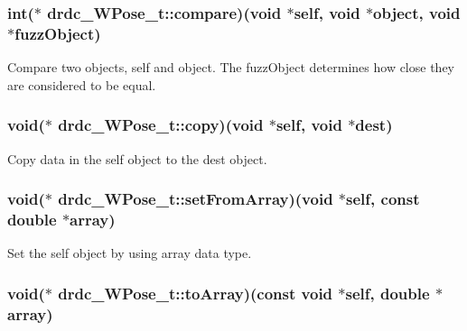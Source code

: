 \hypertarget{structdrdc__WPose__t_99b866961db8996097b6febfc6dad41e}{
\subsubsection[compare]{\setlength{\rightskip}{0pt plus 5cm}int($\ast$ {\bf drdc\_\-WPose\_\-t::compare})(void $\ast$self, void $\ast$object, void $\ast$fuzzObject)}}
\label{structdrdc__WPose__t_99b866961db8996097b6febfc6dad41e}


Compare two objects, self and object. The fuzzObject determines how close they are considered to be equal. 

\hypertarget{structdrdc__WPose__t_47a1b48fdc344f82d3d3597c93b41ed5}{
\subsubsection[copy]{\setlength{\rightskip}{0pt plus 5cm}void($\ast$ {\bf drdc\_\-WPose\_\-t::copy})(void $\ast$self, void $\ast$dest)}}
\label{structdrdc__WPose__t_47a1b48fdc344f82d3d3597c93b41ed5}


Copy data in the self object to the dest object. 

\hypertarget{structdrdc__WPose__t_a41798cf029e6d51ccc7ef79c2bf3f6f}{
\subsubsection[setFromArray]{\setlength{\rightskip}{0pt plus 5cm}void($\ast$ {\bf drdc\_\-WPose\_\-t::setFromArray})(void $\ast$self, const double $\ast$array)}}
\label{structdrdc__WPose__t_a41798cf029e6d51ccc7ef79c2bf3f6f}


Set the self object by using array data type. 

\hypertarget{structdrdc__WPose__t_e169ad4485ee2021344b82ee2e2f282b}{
\subsubsection[toArray]{\setlength{\rightskip}{0pt plus 5cm}void($\ast$ {\bf drdc\_\-WPose\_\-t::toArray})(const void $\ast$self, double $\ast$array)}}
\label{structdrdc__WPose__t_e169ad4485ee2021344b82ee2e2f282b}


